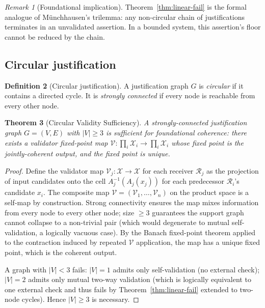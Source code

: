 \documentclass[11pt,twocolumn,a4paper]{article}
\newtheorem{theorem}{Theorem}[section]
\theoremstyle{definition}
\newtheorem{definition}[theorem]{Definition}
\theoremstyle{remark}
\newtheorem{remark}[theorem]{Remark}
\newcommand{\Cands}{\mathcal{X}}
\newcommand{\receiver}{\mathcal{R}}
\begin{document}
\begin{remark}[Foundational implication]
Theorem~\ref{thm:linear-fail} is the formal analogue of Münchhausen's trilemma: any non-circular chain of justifications terminates in an unvalidated assertion. In a bounded system, this assertion's floor cannot be reduced by the chain.
\end{remark}

\subsection{Circular justification}

\begin{definition}[Circular justification]
\label{def:circular}
A justification graph $G$ is \emph{circular} if it contains a directed cycle. It is \emph{strongly connected} if every node is reachable from every other node.
\end{definition}

\begin{theorem}[Circular Validity Sufficiency]
\label{thm:circular}
A strongly-connected justification graph $G = (V, E)$ with $|V| \geq 3$ is sufficient for foundational coherence: there exists a validator fixed-point map $\mathcal{V}: \prod_i \Cands_i \to \prod_i \Cands_i$ whose fixed point is the jointly-coherent output, and the fixed point is unique.
\end{theorem}

\begin{proof}
Define the validator map $\mathcal{V}_j: \Cands \to \Cands$ for each receiver $\receiver_j$ as the projection of input candidates onto the cell $A_j^{-1}(A_j(x_j))$ for each predecessor $\receiver_i$'s candidate $x_i$. The composite map $\mathcal{V} = (\mathcal{V}_1, \ldots, \mathcal{V}_n)$ on the product space is a self-map by construction. Strong connectivity ensures the map mixes information from every node to every other node; size $\geq 3$ guarantees the support graph cannot collapse to a non-trivial pair (which would degenerate to mutual self-validation, a logically vacuous case). By the Banach fixed-point theorem \citep{banach1922operations} applied to the contraction induced by repeated $\mathcal{V}$ application, the map has a unique fixed point, which is the coherent output.

A graph with $|V| < 3$ fails: $|V| = 1$ admits only self-validation (no external check); $|V| = 2$ admits only mutual two-way validation (which is logically equivalent to one external check and thus fails by Theorem~\ref{thm:linear-fail} extended to two-node cycles). Hence $|V| \geq 3$ is necessary.
\end{proof}
\end{document}
